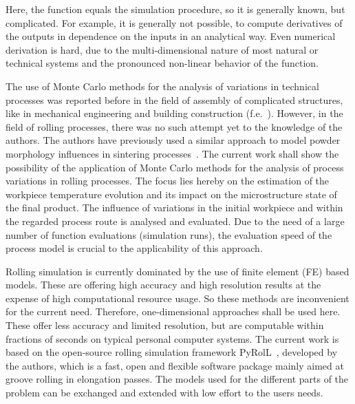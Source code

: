 Here, the function equals the simulation procedure, so it is generally known, but complicated.
For example, it is generally not possible, to compute derivatives of the outputs in dependence on the inputs in an analytical way.
Even numerical derivation is hard, due to the multi-dimensional nature of most natural or technical systems and the pronounced non-linear behavior of the function.

The use of Monte Carlo methods for the analysis of variations in technical processes was reported before in the field of assembly of complicated structures, like in mechanical engineering and building construction (f.e.~\cite{Lin1997, Shen2005, Dantan2009, Qureshi2012, Yan2015, Rausch2019}).
However, in the field of rolling processes, there was no such attempt yet to the knowledge of the authors.
The authors have previously used a similar approach to model powder morphology influences in sintering processes~\cite{Weiner2022, Weiner2022b}.
The current work shall show the possibility of the application of Monte Carlo methods for the analysis of process variations in rolling processes.
The focus lies hereby on the estimation of the workpiece temperature evolution and its impact on the microstructure state of the final product.
The influence of variations in the initial workpiece and within the regarded process route is analysed and evaluated.
Due to the need of a large number of function evaluations (simulation runs), the evaluation speed of the process model is crucial to the applicability of this approach.

Rolling simulation is currently dominated by the use of finite element (FE) based models.
These are offering high accuracy and high resolution results at the expense of high computational resource usage.
So these methods are inconvenient for the current need.
Therefore, one-dimensional approaches shall be used here.
These offer less accuracy and limited resolution, but are computable within fractions of seconds on typical personal computer systems.
The current work is based on the open-source rolling simulation framework PyRolL~\cite{pyroll_jors}, developed by the authors, which is a fast, open and flexible software package mainly aimed at groove rolling in elongation passes.
The models used for the different parts of the problem can be exchanged and extended with low effort to the users needs.

